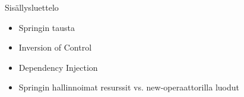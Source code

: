 \documentclass[hyperref={pdfauthor=\AUTHOR},14pt]{beamer}
\author{\AUTHOR}
\title[\TITLE]{\TITLE}
\date{\DATE}
\begin{document}
\begin{frame}[plain]
\titlepage
\end{frame}

\begin{frame}[t, fragile]{Sisällysluettelo}
\begin{itemize}
\item Springin tausta
\item Inversion of Control
\item Dependency Injection
\item Springin hallinnoimat resurssit vs. new-operaattorilla luodut
\end{itemize}
\end{frame}

\end{document}
